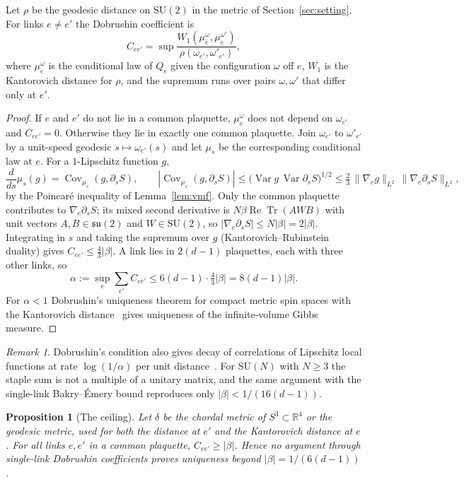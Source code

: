 \documentclass[11pt]{amsart}
\newtheorem{proposition}[theorem]{Proposition}
\theoremstyle{definition}
\theoremstyle{remark}
\newtheorem{remark}[theorem]{Remark}
\newcommand{\R}{\mathbb{R}}
\newcommand{\SU}{\mathrm{SU}}
\newcommand{\ReTr}{\operatorname{Re}\operatorname{Tr}}
\newcommand{\Cov}{\operatorname{Cov}}
\newcommand{\Var}{\operatorname{Var}}
\begin{document}
Let $\rho$ be the geodesic distance on $\SU(2)$ in the metric of
Section~\ref{sec:setting}. For links $e\ne e'$ the Dobrushin coefficient is
\[
C_{ee'}=\sup\frac{W_1(\mu_e^\omega,\mu_e^{\omega'})}{\rho(\omega_{e'},
\omega'_{e'})},
\]
where $\mu_e^\omega$ is the conditional law of $Q_e$ given the configuration
$\omega$ off $e$, $W_1$ is the Kantorovich distance for $\rho$, and the
supremum runs over pairs $\omega,\omega'$ that differ only at $e'$.

\begin{proof}
If $e$ and $e'$ do not lie in a common plaquette, $\mu_e^\omega$ does not depend
on $\omega_{e'}$ and $C_{ee'}=0$. Otherwise they lie in exactly one common
plaquette. Join $\omega_{e'}$ to $\omega'_{e'}$ by a unit-speed geodesic
$s\mapsto\omega_{e'}(s)$ and let $\mu_s$ be the corresponding conditional law at
$e$. For a $1$-Lipschitz function $g$,
\[
\frac{d}{ds}\mu_s(g)=\Cov_{\mu_s}(g,\partial_sS),\qquad
|\Cov_{\mu_s}(g,\partial_sS)|\le\bigl(\Var g\,\Var\partial_sS\bigr)^{1/2}
\le\tfrac23\,\|\nabla_eg\|_{L^2}\,\|\nabla_e\partial_sS\|_{L^2},
\]
by the Poincar\'e inequality of Lemma~\ref{lem:vmf}. Only the common plaquette
contributes to $\nabla_e\partial_sS$; its mixed second derivative is
$N\beta\ReTr(AWB)$ with unit vectors $A,B\in\mathfrak{su}(2)$ and $W\in\SU(2)$,
so $|\nabla_e\partial_sS|\le N|\beta|=2|\beta|$. Integrating in $s$ and taking
the supremum over $g$ (Kantorovich--Rubinstein duality) gives
$C_{ee'}\le\frac43|\beta|$. A link lies in $2(d-1)$ plaquettes, each with three
other links, so
\[
\alpha:=\sup_e\sum_{e'}C_{ee'}\le6(d-1)\cdot\tfrac43|\beta|=8(d-1)|\beta|.
\]
For $\alpha<1$ Dobrushin's uniqueness theorem for compact metric spin spaces
with the Kantorovich distance~\cite{Dob70,DSa23} gives uniqueness of the
infinite-volume Gibbs measure.
\end{proof}

\begin{remark}
Dobrushin's condition also gives decay of correlations of Lipschitz local
functions at rate $\log(1/\alpha)$ per unit distance~\cite{Fol82}. For $\SU(N)$
with $N\ge3$ the staple sum is not a multiple of a unitary matrix, and the same
argument with the single-link Bakry--\'Emery bound reproduces only
$|\beta|<1/(16(d-1))$.
\end{remark}

\begin{proposition}[The ceiling]\label{prop:ceiling}
Let $\delta$ be the chordal metric of $S^3\subset\R^4$ or the geodesic metric,
used for both the distance at $e'$ and the Kantorovich distance at $e$. For all
links $e,e'$ in a common plaquette, $C_{ee'}\ge|\beta|$. Hence no argument
through single-link Dobrushin coefficients proves uniqueness beyond
$|\beta|=1/(6(d-1))$.
\end{proposition}
\end{document}
